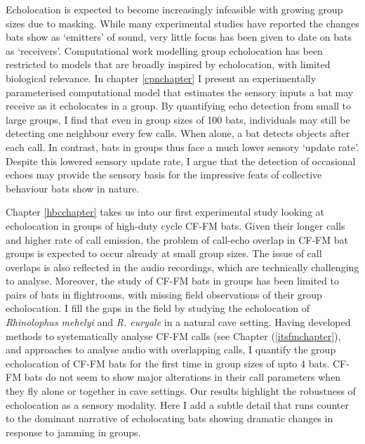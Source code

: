 \documentclass[
]{book}
\begin{document}
Echolocation is expected to become increasingly infeasible with growing group sizes due to masking. While many experimental studies have reported the changes bats show as `emitters' of sound, very little focus has been given to date on bats as `receivers'. Computational work modelling group echolocation has been restricted to models that are broadly inspired by echolocation, with limited biological relevance. In chapter \ref{cpnchapter} I present an experimentally parameterised computational model that estimates the sensory inputs a bat may receive as it echolocates in a group. By quantifying echo detection from small to large groups, I find that even in group sizes of 100 bats, individuals may still be detecting one neighbour every few calls. When alone, a bat detects objects after each call. In contrast, bats in groups thus face a much lower sensory `update rate'. Despite this lowered sensory update rate, I argue that the detection of occasional echoes may provide the sensory basis for the impressive feats of collective behaviour bats show in nature.

Chapter \ref{hbcchapter} takes us into our first experimental study looking at echolocation in groups of high-duty cycle CF-FM bats. Given their longer calls and higher rate of call emission, the problem of call-echo overlap in CF-FM bat groups is expected to occur already at small group sizes. The issue of call overlaps is also reflected in the audio recordings, which are technically challenging to analyse. Moreover, the study of CF-FM bats in groups has been limited to pairs of bats in flightrooms, with missing field observations of their group echolocation. I fill the gaps in the field by studying the echolocation of \emph{Rhinolophus mehelyi} and \emph{R. euryale} in a natural cave setting. Having developed methods to systematically analyse CF-FM calls (see Chapter (\ref{itsfmchapter}), and approaches to analyse audio with overlapping calls, I quantify the group echolocation of CF-FM bats for the first time in group sizes of upto 4 bats. CF-FM bats do not seem to show major alterations in their call parameters when they fly alone or together in cave settings. Our results highlight the robustness of echolocation as a sensory modality. Here I add a subtle detail that runs counter to the dominant narrative of echolocating bats showing dramatic changes in response to jamming in groups.
\end{document}

